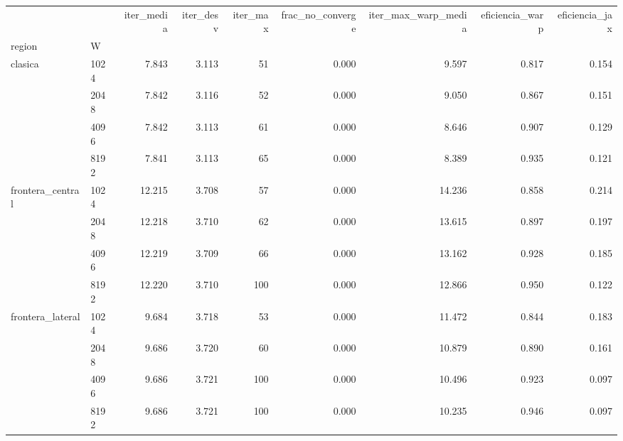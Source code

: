 \begin{tabular}{llrrrrrrr}
\toprule
 &  & iter_media & iter_desv & iter_max & frac_no_converge & iter_max_warp_media & eficiencia_warp & eficiencia_jax \\
region & W &  &  &  &  &  &  &  \\
\midrule
\multirow[t]{4}{*}{clasica} & 1024 & 7.843 & 3.113 & 51 & 0.000 & 9.597 & 0.817 & 0.154 \\
 & 2048 & 7.842 & 3.116 & 52 & 0.000 & 9.050 & 0.867 & 0.151 \\
 & 4096 & 7.842 & 3.113 & 61 & 0.000 & 8.646 & 0.907 & 0.129 \\
 & 8192 & 7.841 & 3.113 & 65 & 0.000 & 8.389 & 0.935 & 0.121 \\
\cline{1-9}
\multirow[t]{4}{*}{frontera_central} & 1024 & 12.215 & 3.708 & 57 & 0.000 & 14.236 & 0.858 & 0.214 \\
 & 2048 & 12.218 & 3.710 & 62 & 0.000 & 13.615 & 0.897 & 0.197 \\
 & 4096 & 12.219 & 3.709 & 66 & 0.000 & 13.162 & 0.928 & 0.185 \\
 & 8192 & 12.220 & 3.710 & 100 & 0.000 & 12.866 & 0.950 & 0.122 \\
\cline{1-9}
\multirow[t]{4}{*}{frontera_lateral} & 1024 & 9.684 & 3.718 & 53 & 0.000 & 11.472 & 0.844 & 0.183 \\
 & 2048 & 9.686 & 3.720 & 60 & 0.000 & 10.879 & 0.890 & 0.161 \\
 & 4096 & 9.686 & 3.721 & 100 & 0.000 & 10.496 & 0.923 & 0.097 \\
 & 8192 & 9.686 & 3.721 & 100 & 0.000 & 10.235 & 0.946 & 0.097 \\
\cline{1-9}
\bottomrule
\end{tabular}
